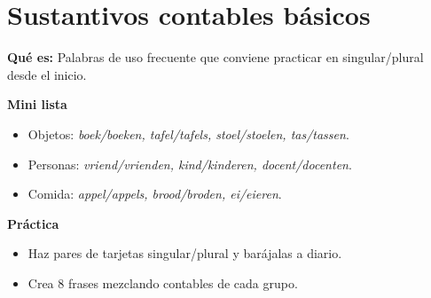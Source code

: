 \section{Sustantivos contables básicos}
\textbf{Qué es:} Palabras de uso frecuente que conviene practicar en singular/plural desde el inicio.

\textbf{Mini lista}
\begin{itemize}[leftmargin=*]
  \item Objetos: \textit{boek/boeken, tafel/tafels, stoel/stoelen, tas/tassen}.
  \item Personas: \textit{vriend/vrienden, kind/kinderen, docent/docenten}.
  \item Comida: \textit{appel/appels, brood/broden, ei/eieren}.
\end{itemize}

\textbf{Práctica}
\begin{itemize}[leftmargin=*]
  \item Haz pares de tarjetas singular/plural y barájalas a diario.
  \item Crea 8 frases mezclando contables de cada grupo.
\end{itemize}
